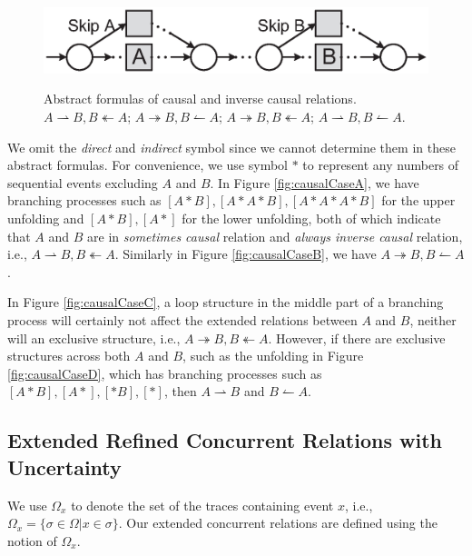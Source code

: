 \documentclass{llncs}
\begin{document}
\begin{figure}[htbp]
{\begin{minipage}[b]{0.45\textwidth}
		\centering
		\includegraphics[width=1.0\textwidth]{fig_causal_case_d}
	\end{minipage}
	\label{fig:causalCaseD}
}
\caption{Abstract formulas of causal and inverse causal relations.  $A\rightharpoonup B, B\twoheadleftarrow A$;  $A\twoheadrightarrow B, B\leftharpoonup A$;  $A\twoheadrightarrow B, B\twoheadleftarrow A$;  $A\rightharpoonup B, B\leftharpoonup A$.\label{fig:causalCases}}
\end{figure}

We omit the \textit{direct} and \textit{indirect} symbol since we cannot determine them in these abstract formulas. For convenience, we use symbol $*$ to represent any numbers of sequential events excluding $A$ and $B$. In Figure \ref{fig:causalCaseA}, we have branching processes such as $[A*B],[A*A*B],[A*A*A*B]$ for the upper unfolding and $[A*B],[A*]$ for the lower unfolding, both of which indicate that $A$ and $B$ are in \textit{sometimes causal} relation and \textit{always inverse causal} relation, i.e., $A\rightharpoonup B,B\twoheadleftarrow A$. Similarly in Figure \ref{fig:causalCaseB}, we have $A\twoheadrightarrow B,B\leftharpoonup A$.

In Figure \ref{fig:causalCaseC}, a loop structure in the middle part of a branching process will certainly not affect the extended relations between $A$ and $B$, neither will an exclusive structure, i.e., $A\twoheadrightarrow B,B\twoheadleftarrow A$. However, if there are exclusive structures across both $A$ and $B$, such as the unfolding in Figure \ref{fig:causalCaseD}, which has branching processes such as $[A*B],[A*],[*B],[*]$, then $A\rightharpoonup B$ and $B\leftharpoonup A$.

\subsection{Extended Refined Concurrent Relations with Uncertainty}\label{subsec:concurrent}
We use $\Omega_{x}$ to denote the set of the traces containing event $x$, i.e., $\Omega_{x}=\{\sigma\in\Omega|x\in\sigma\}$. Our extended concurrent relations are defined using the notion of $\Omega_{x}$.
\end{document}
